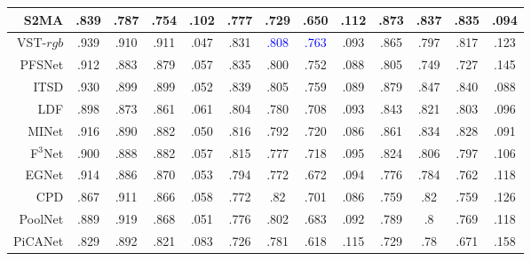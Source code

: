 \begin{table}[!ht]
{\begin{tabular}{rcccccccccccc}
			S2MA    \upcite{liu2020learning} 
			& .839 & .787 & .754 & 	.102 
			& .777 & .729 & .650 & .112 
			& .873 & .837 &	.835 & .094 \\
			
			
			\midrule[1pt] 
			
			
			VST-$rgb$ \upcite{liu2021visual} 
			& .939 & .910 & .911 & .047
			& .831 & \textcolor{blue}{.808} & \textcolor{blue}{.763} & .093 
			& .865 & .797 & .817 & .123 
			\\ 
			
			PFSNet \upcite{ma2021pyramidal}
			& .912 & .883 & .879 & .057 
			& .835 & .800 & .752 & .088 
			& .805 & .749 & .727 & .145 
			\\ 
			
			
			ITSD \upcite{zhou2020interactive} 
			& .930 & .899 & .899 & .052 
			& .839 & .805 & .759 & .089 
			& .879 & .847 & .840 & .088 
			\\ 
			
			
			
			LDF \upcite{wei2020label} 
			& .898 & .873 & .861 & .061 
			& .804 & .780 & .708 & .093 
			& .843 & .821 & .803 & .096 
			\\ 
			
			
			MINet \upcite{pang2020multi} 
			& .916 & .890 & .882 & .050 
			& .816 & .792 & .720 & .086 
			& .861 & .834 & .828 & .091 
			\\ 
			
			F$^{3}$Net  \upcite{wei2020f3net}
			& .900 & .888 & .882 & .057 
			& .815 & .777 & .718 & .095 
			& .824 & .806 & .797 & .106 
			\\ 
			
			
			EGNet   \upcite{zhao2019egnet}
			& .914 & .886 & .870 & .053 
			& .794 & .772 & .672 & .094 
			& .776 & .784 & .762 & .118 
			\\ 
			
			CPD  \upcite{wu2019cascaded}
			& .867 & .911 & .866 & .058 
			& .772 & .82  & .701 & .086 
			& .759 & .82  & .759 & .126 \\
			
			PoolNet \upcite{liu2019simple}
			& .889 & .919 & .868 & .051 
			& .776 & .802 & .683 & .092 
			& .789 & .8   & .769 & .118 \\
			
			PiCANet \upcite{liu2018picanet}
			& .829 & .892 & .821 & .083 
			& .726 & .781 & .618 & .115 
			& .729 & .78  & .671 & .158 \\
			

\end{tabular}}
\end{table}
